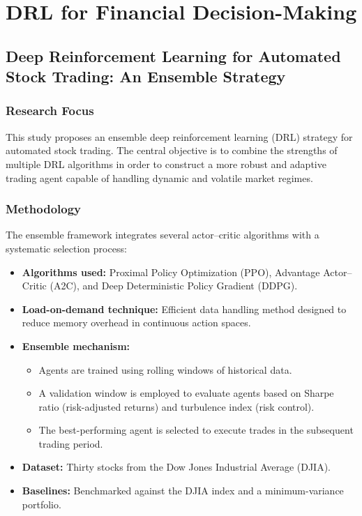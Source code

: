 \documentclass[12pt,a4paper]{report}
\begin{document}

\section{DRL for Financial Decision-Making}

\subsection{Deep Reinforcement Learning for Automated Stock Trading: An Ensemble Strategy \cite{yang2020ensemble}}

\subsubsection{Research Focus}
This study proposes an ensemble deep reinforcement learning (DRL) strategy for automated stock trading. The central objective is to combine the strengths of multiple DRL algorithms in order to construct a more robust and adaptive trading agent capable of handling dynamic and volatile market regimes.

\subsubsection{Methodology}
The ensemble framework integrates several actor–critic algorithms with a systematic selection process:
\begin{itemize}
    \item \textbf{Algorithms used:} Proximal Policy Optimization (PPO), Advantage Actor–Critic (A2C), and Deep Deterministic Policy Gradient (DDPG).  
    \item \textbf{Load-on-demand technique:} Efficient data handling method designed to reduce memory overhead in continuous action spaces.  
    \item \textbf{Ensemble mechanism:}  
    \begin{itemize}
        \item Agents are trained using rolling windows of historical data.  
        \item A validation window is employed to evaluate agents based on Sharpe ratio (risk-adjusted returns) and turbulence index (risk control).  
        \item The best-performing agent is selected to execute trades in the subsequent trading period.  
    \end{itemize}
    \item \textbf{Dataset:} Thirty stocks from the Dow Jones Industrial Average (DJIA).  
    \item \textbf{Baselines:} Benchmarked against the DJIA index and a minimum-variance portfolio.  
\end{itemize}
\end{document}
